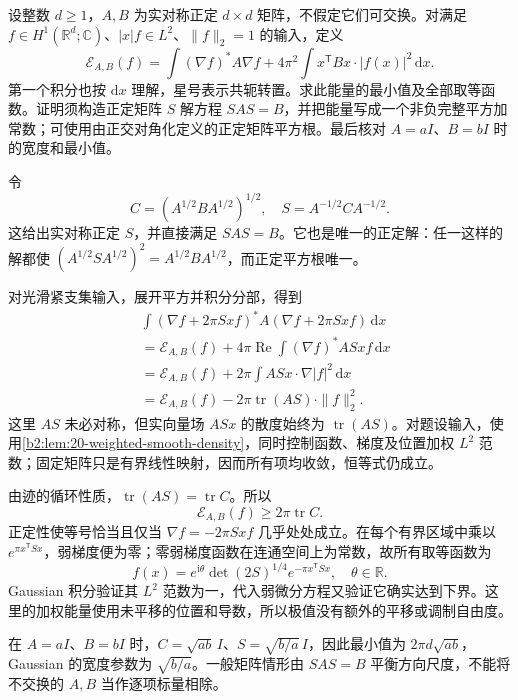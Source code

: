 \begin{optionalexercise}\label{b2:ex:20-new-2}
设整数 \(d\geq1\)，\(A,B\) 为实对称正定 \(d\times d\) 矩阵，不假定它们可交换。对满足
\(f\in H^1(\mathbb R^d;\mathbb C)\)、\(|x|f\in L^2\)、\(\|f\|_2=1\) 的输入，定义
\[
 \mathcal E_{A,B}(f)
 =\int(\nabla f)^*A\nabla f
       +4\pi^2\int x^{\mathsf T}Bx\cdot|f(x)|^2\,\mathrm dx.
\]
第一个积分也按 \(\mathrm dx\) 理解，星号表示共轭转置。求此能量的最小值及全部取等函数。证明须构造正定矩阵 \(S\) 解方程 \(SAS=B\)，并把能量写成一个非负完整平方加常数；可使用由正交对角化定义的正定矩阵平方根。最后核对 \(A=aI\)、\(B=bI\) 时的宽度和最小值。
\end{optionalexercise}
\begin{solution}
令
\[
 C=(A^{1/2}BA^{1/2})^{1/2},
 \quad S=A^{-1/2}CA^{-1/2}.
\]
这给出实对称正定 \(S\)，并直接满足 \(SAS=B\)。它也是唯一的正定解：任一这样的解都使 \((A^{1/2}SA^{1/2})^2=A^{1/2}BA^{1/2}\)，而正定平方根唯一。

对光滑紧支集输入，展开平方并积分分部，得到
\[
 \begin{aligned}
 &\int(\nabla f+2\pi Sx f)^*A(\nabla f+2\pi Sx f)\,\mathrm dx\\
 &=\mathcal E_{A,B}(f)
   +4\pi\operatorname{Re}\int(\nabla f)^*ASx f\,\mathrm dx\\
 &=\mathcal E_{A,B}(f)
   +2\pi\int ASx\cdot\nabla|f|^2\,\mathrm dx\\
 &=\mathcal E_{A,B}(f)-2\pi\operatorname{tr}(AS)\cdot\|f\|_2^2.
 \end{aligned}
\]
这里 \(AS\) 未必对称，但实向量场 \(ASx\) 的散度始终为 \(\operatorname{tr}(AS)\)。对题设输入，使用\cref{b2:lem:20-weighted-smooth-density}，同时控制函数、梯度及位置加权 \(L^2\) 范数；固定矩阵只是有界线性映射，因而所有项均收敛，恒等式仍成立。

由迹的循环性质，\(\operatorname{tr}(AS)=\operatorname{tr}C\)。所以
\[
 \mathcal E_{A,B}(f)\geq2\pi\operatorname{tr}C.
\]
正定性使等号恰当且仅当 \(\nabla f=-2\pi Sx f\) 几乎处处成立。在每个有界区域中乘以 \(e^{\pi x^{\mathsf T}Sx}\)，弱梯度便为零；零弱梯度函数在连通空间上为常数，故所有取等函数为
\[
 f(x)=e^{\mathrm i\theta}\det(2S)^{1/4}
                       e^{-\pi x^{\mathsf T}Sx},
 \quad \theta\in\mathbb R.
\]
Gaussian 积分验证其 \(L^2\) 范数为一，代入弱微分方程又验证它确实达到下界。这里的加权能量使用未平移的位置和导数，所以极值没有额外的平移或调制自由度。

在 \(A=aI\)、\(B=bI\) 时，\(C=\sqrt{ab}\,I\)、\(S=\sqrt{b/a}\,I\)，因此最小值为 \(2\pi d\sqrt{ab}\)，Gaussian 的宽度参数为 \(\sqrt{b/a}\)。一般矩阵情形由 \(SAS=B\) 平衡方向尺度，不能将不交换的 \(A,B\) 当作逐项标量相除。
\end{solution}

